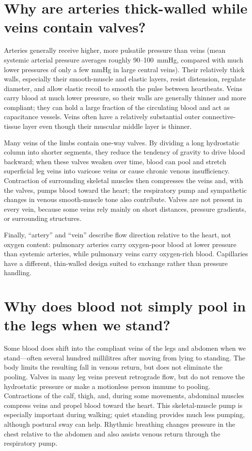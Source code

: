\documentclass[11pt,oneside]{report}
\begin{document}
\section{Why are arteries thick-walled while veins contain valves?}

Arteries generally receive higher, more pulsatile pressure than veins (mean
systemic arterial pressure averages roughly 90--100~mmHg, compared with much
lower pressures of only a few mmHg in large central veins). Their
relatively thick walls, especially their smooth-muscle and elastic layers,
resist distension, regulate diameter, and allow elastic recoil to smooth the
pulse between heartbeats. Veins carry blood at much lower pressure, so their
walls are generally thinner and more compliant; they can hold a large fraction
of the circulating blood and act as capacitance vessels. Veins often have a
relatively substantial outer connective-tissue layer even though their
muscular middle layer is thinner.

Many veins of the limbs contain one-way valves. By dividing a long hydrostatic
column into shorter segments, they reduce the tendency of gravity to drive
blood backward; when these valves weaken over time, blood can pool and stretch
superficial leg veins into varicose veins or cause chronic venous insufficiency. Contraction of surrounding skeletal muscles then compresses
the veins and, with the valves, pumps blood toward the heart; the respiratory
pump and sympathetic changes in venous smooth-muscle tone also contribute.
Valves are not present in every vein, because some veins rely mainly on short
distances, pressure gradients, or surrounding structures.

Finally, ``artery'' and ``vein'' describe flow direction relative to the heart,
not oxygen content: pulmonary arteries carry oxygen-poor blood at lower pressure
than systemic arteries, while pulmonary veins carry oxygen-rich blood.
Capillaries have a different, thin-walled design suited to exchange rather than
pressure handling.

\section{Why does blood not simply pool in the legs when we stand?}

Some blood does shift into the compliant veins of the legs and abdomen when we
stand---often several hundred millilitres after moving from lying to standing.
The body limits the resulting fall in venous return, but does not eliminate the
pooling. Valves in many leg veins prevent retrograde flow, but do not remove
the hydrostatic pressure or make a motionless person immune to pooling.
Contractions of the calf, thigh, and, during some movements, abdominal muscles
compress veins and propel blood toward the heart. This skeletal-muscle pump is
especially important during walking; quiet standing provides much less pumping,
although postural sway can help. Rhythmic breathing changes pressure in the
chest relative to the abdomen and also assists venous return through the
respiratory pump.
\end{document}
